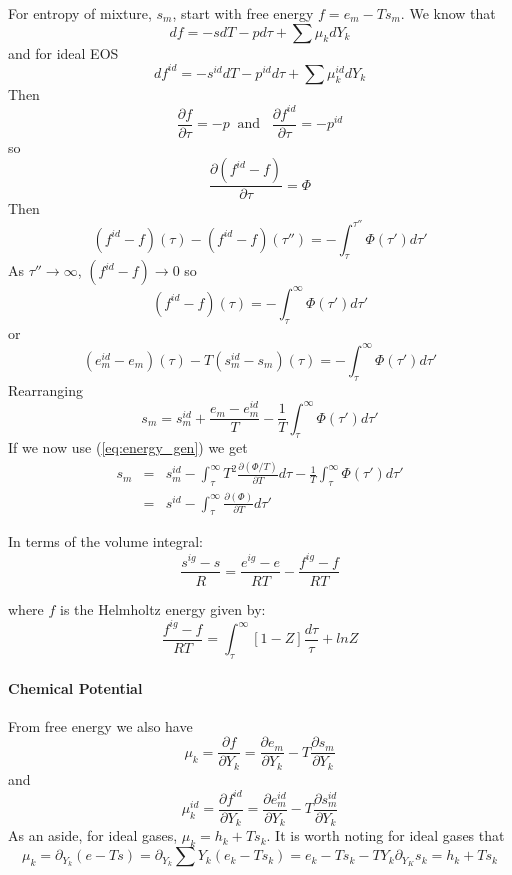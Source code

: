 \documentclass[11pt]{article}
\begin{document}
For entropy of mixture, $s_m$,
start with free energy $f = e_m - Ts_m$.
We know that
\[
df = -s dT - p d\tau + \sum \mu_k dY_k
\]
and for ideal EOS
\[
df^{id} = -s^{id} dT - p^{id} d\tau + \sum \mu_k^{id} dY_k
\]
Then
\begin{equation}
\frac{\partial f}{\partial \tau} = -p \;\; \mathrm{and} \;\;\;
\frac{\partial f^{id}}{\partial \tau} = -p^{id}
\end{equation}
so
\[
\frac{\partial (f^{id} - f)}{\partial \tau} = \Phi
\]
Then
\begin{equation}
(f^{id} - f)(\tau) - 
(f^{id} - f)(\tau '' ) = -\int_\tau^{\tau ''} \Phi (\tau ')d\tau ' 
\end{equation}
As $\tau'' \rightarrow \infty$, $( f^{id}-f) \rightarrow 0$
so
\begin{equation}
(f^{id} - f)(\tau) 
 = -\int_\tau^{\infty} \Phi (\tau ')d\tau ' 
\end{equation}
or
\begin{equation}
(e_m^{id} - e_m)(\tau) - 
T(s_m^{id} - s_m)(\tau) 
 = -\int_\tau^{\infty} \Phi (\tau ')d\tau ' 
\end{equation}
Rearranging
\begin{equation}
s_m = s_m^{id} + \frac{e_m-e_m^{id}}{T} - \frac{1}{T}
\int_\tau^{\infty} \Phi (\tau ')d\tau ' 
\end{equation}
If we now use (\ref{eq:energy_gen})
we get
\begin{eqnarray}
s_m &=& s_m^{id} -
\int_\tau^\infty  T^2 \frac{\partial (\Phi/T)} {\partial T} d\tau
- \frac{1}{T}
\int_\tau^{\infty} \Phi (\tau ')d\tau '  \\
&=& s^{id}
-\int_\tau^{\infty} \frac{\partial (\Phi)} {\partial T} d\tau ' 
\end{eqnarray}

In terms of the volume integral:
\begin{equation}
\frac{s^{ig}-s}{R} = \frac{e^{ig}-e}{RT}  -  \frac{f^{ig}-f}{RT}
\end{equation}

where $f$ is the Helmholtz energy given by:
\begin{equation}
\frac{f^{ig}-f}{RT} = \int_{\tau}^{\infty} \left[1-Z\right]\frac{d\tau}{\tau} + ln Z
\end{equation}


\paragraph{Chemical Potential}

From free energy we also have
\[
\mu_k = \frac{\partial f}{\partial Y_k} = 
 \frac{\partial e_m}{\partial Y_k} - 
 T\frac{\partial s_m}{\partial Y_k} 
\]
and
\[
\mu_k^{id} = \frac{\partial f^{id}}{\partial Y_k} = 
 \frac{\partial e_m^{id}}{\partial Y_k} - 
 T\frac{\partial s_m^{id}}{\partial Y_k} 
\]
As an aside, for ideal gases, $\mu_k = h_k + T s_k$.  It is worth noting for ideal gases 
that
\[
\mu_k = \partial_{Y_k} (e - T s) = 
 \partial_{Y_k} \sum Y_k(e_k - T s_k) = e_k - T s_k - T Y_k \partial_{Y_K}s_k = h_k + T s_k
\]
\end{document}

